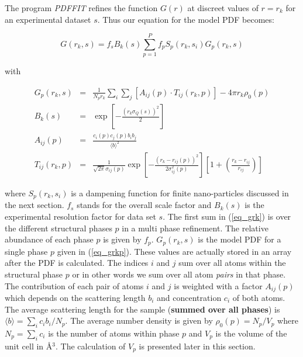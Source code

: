 The program {\it PDFFIT} refines the function $G(r)$ at discreet
values of $r=r_{k}$ for an experimental dataset $s$. Thus our
equation for the model PDF becomes:

\begin{equation}
  G(r_{k},s) = f_{s} B_{k}(s)
               \sum_{p=1}^{P} f_{p} S_{p}(r_{k},s_{i}) G_{p}(r_{k},s)
  \label{eq_grk}
\end{equation}

\noindent
with

\begin{eqnarray}
  G_{p}(r_{k},s)  & = & \frac{1}{N_{p}r_{k}}
                        \sum_{i}\sum_{j} \left [ A_{ij}(p) \cdot
                        T_{ij}(r_{k},p) \right ] - 4\pi r_{k}\rho_{0}(p) \\
  \label{eq_grkp}
  B_{k}(s)        & = & \exp \left [ - \frac{(r_{k}\sigma_{Q}(s))^{2}}
                        {2}\right ] \\
  \label{eq_bk}
  A_{ij}(p)       & = & \frac{c_{i}(p)c_{j}(p)b_{i}b_{j}}
                        {\langle b \rangle ^{2}}
  \label{eq_aij}           \\
  T_{ij}(r_{k},p) & = & \frac{1}{\sqrt{2\pi}\sigma_{ij}(p)}
                        \exp \left [ - \frac{(r_{k}-r_{ij}(p))^{2}}
                        {2 \sigma_{ij}^{2}(p)} \right ]
                        \left [ 1 + \left ( \frac{r_{k} - r_{ij}}{r_{ij}}
                        \right ) \right ]
  \label{eq_tij}
\end{eqnarray}

\noindent where $S_{p}(r_{k},s_{i})$ is a dampening function for
finite nano-particles discussed in the next section. $f_{s}$ stands
for the overall scale factor and $B_{k}(s)$ is the experimental
resolution factor for data set $s$. The first sum in (\ref{eq_grk})
is over the different structural phases $p$ in a multi phase
refinement. The relative abundance of each phase $p$ is given by
$f_{p}$. $G_{p}(r_{k},s)$ is the model PDF for a single phase $p$
given in (\ref{eq_grkp}). These values are actually stored in an
array after the PDF is calculated. The indices $i$ and $j$ sum over
all atoms within the structural phase $p$ or in other words we sum
over all atom {\it pairs} in that phase. The contribution of each
pair of atoms $i$ and $j$ is weighted with a factor $A_{ij}(p)$
which depends on the scattering length $b_{i}$ and concentration
$c_{i}$ of both atoms. The average scattering length for the sample
({\bf summed over all phases}) is $\langle b \rangle =
\sum_{i}c_{i}b_{i}/N_{p}$. The average number density is given by
$\rho_{0}(p) = N_{p}/V_{p}$ where $N_{p} = \sum_{i}c_{i}$ is the
number of atoms within phase $p$ and $V_{p}$ is the volume of the
unit cell in \AA$^{3}$. The calculation of $V_{p}$ is presented
later in this section. \par

